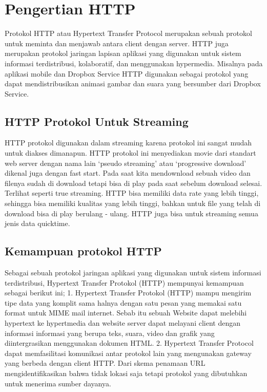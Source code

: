 
\section{Pengertian HTTP}
Protokol HTTP atau Hypertext Transfer Protocol merupakan sebuah protokol untuk meminta dan menjawab antara client dengan server. HTTP juga merupakan protokol jaringan lapisan aplikasi yang digunakan untuk sistem informasi terdistribusi, kolaboratif, dan menggunakan hypermedia. Misalnya pada aplikasi mobile dan Dropbox Service HTTP digunakan  sebagai protokol yang dapat mendistribusikan animasi gambar dan suara yang bersumber dari Dropbox Service.

\subsection{HTTP Protokol Untuk Streaming}
HTTP protokol digunakan dalam streaming karena protokol ini sangat mudah untuk diakses dimanapun. HTTP protokol ini menyediakan movie dari standart web server dengan nama lain `pseudo streaming' atau `progressive download' dikenal juga dengan fast start. Pada saat kita mendownload sebuah video dan filenya sudah di download tetapi bisa di play pada saat sebelum download selesai. Terlihat seperti true streaming. HTTP bisa memiliki data rate yang lebih tinggi, sehingga bisa memiliki kualitas yang lebih tinggi, bahkan untuk file yang telah di download bisa di play berulang - ulang. HTTP juga bisa untuk streaming semua jenis data quicktime\cite{putra2010analisis}.

\subsection{Kemampuan protokol HTTP}
Sebagai sebuah protokol jaringan aplikasi yang digunakan untuk sistem informasi terdistribusi, Hypertext Transfer Protokol (HTTP) mempunyai kemampuan sebagai berikut ini;
1. Hypertext Transfer Protokol (HTTP) mampu mengirim tipe data yang komplit sama halnya dengan satu pesan yang memakai satu format untuk MIME mail internet. Sebab itu sebuah Website dapat melebihi hypertext ke hypertmedia dan website server dapat melayani client dengan informasi informasi yang berupa teks, suara, video dan grafik yang diintergrasikan menggunakan dokumen HTML.
2. Hypertext Transfer Protocol dapat memfasilitasi komunikasi antar protokol lain yang mengunakan gateway yang berbeda dengan client HTTP. Dari skema penamaan URL mengidentifikasikan bahwa tidak lokasi saja tetapi protokol yang dibutuhkan untuk menerima sumber dayanya\cite{lusiana2009sistem}.

